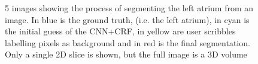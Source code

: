 \begin{figure}[h!]
\centering
{}
\caption{5 images showing the process of segmenting the left atrium from an image. In blue is the ground truth, (i.e. the left atrium), in cyan is the initial guess of the CNN+CRF, in yellow are user scribbles labelling pixels as background and in red is the final segmentation. Only a single 2D slice is shown, but the full image is a 3D volume}
\label{fig:BIFSegEx}
\end{figure}


